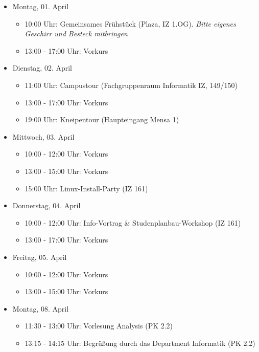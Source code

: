 \begin{itemize}
    \item Montag, 01. April
        \begin{itemize}
            \item 10:00 Uhr: Gemeinsames Frühstück (Plaza, IZ 1.OG). \emph{Bitte eigenes Geschirr und Besteck mitbringen}
            \item 13:00 - 17:00 Uhr: Vorkurs
        \end{itemize}
    \item Dienstag, 02. April
        \begin{itemize}
            \item 11:00 Uhr: Campustour (Fachgruppenraum Informatik IZ, 149/150)
            \item 13:00 - 17:00 Uhr: Vorkurs
            \item 19:00 Uhr: Kneipentour (Haupteingang Mensa 1)
        \end{itemize}
    \item Mittwoch, 03. April
        \begin{itemize}
            \item 10:00 - 12:00 Uhr: Vorkurs
            \item 13:00 - 15:00 Uhr: Vorkurs
            \item 15:00 Uhr: Linux-Install-Party (IZ 161)
        \end{itemize}
    \pagebreak
    \item Donnerstag, 04. April
        \begin{itemize}
            \item 10:00 - 12:00 Uhr: Info-Vortrag \& Studenplanbau-Workshop (IZ 161)
            \item 13:00 - 17:00 Uhr: Vorkurs
        \end{itemize}
    \item Freitag, 05. April
        \begin{itemize}
            \item 10:00 - 12:00 Uhr: Vorkurs
            \item 13:00 - 15:00 Uhr: Vorkurs
        \end{itemize}
    \item Montag, 08. April
        \begin{itemize}
	    \item 11:30 - 13:00 Uhr: Vorlesung Analysis (PK 2.2)
            \item 13:15 - 14:15 Uhr: Begrüßung durch das Department Informatik (PK 2.2)

\end{itemize}
\end{itemize}
